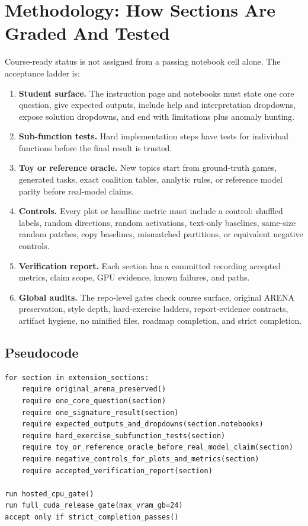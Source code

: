 \documentclass[11pt]{article}
\begin{document}
\section{Methodology: How Sections Are Graded And Tested}
Course-ready status is not assigned from a passing notebook cell alone. The
acceptance ladder is:
\begin{enumerate}
  \item \textbf{Student surface.} The instruction page and notebooks must state
  one core question, give expected outputs, include help and interpretation
  dropdowns, expose solution dropdowns, and end with limitations plus anomaly
  hunting.
  \item \textbf{Sub-function tests.} Hard implementation steps have tests for
  individual functions before the final result is trusted.
  \item \textbf{Toy or reference oracle.} New topics start from ground-truth
  games, generated tasks, exact coalition tables, analytic rules, or reference
  model parity before real-model claims.
  \item \textbf{Controls.} Every plot or headline metric must include a control:
  shuffled labels, random directions, random activations, text-only baselines,
  same-size random patches, copy baselines, mismatched partitions, or
  equivalent negative controls.
  \item \textbf{Verification report.} Each section has a committed
   recording accepted metrics, claim scope,
  GPU evidence, known failures, and paths.
  \item \textbf{Global audits.} The repo-level gates check course surface,
  original ARENA preservation, style depth, hard-exercise ladders,
  report-evidence contracts, artifact hygiene, no minified files, roadmap
  completion, and strict completion.
\end{enumerate}

\subsection*{Pseudocode}
\begin{verbatim}
for section in extension_sections:
    require original_arena_preserved()
    require one_core_question(section)
    require one_signature_result(section)
    require expected_outputs_and_dropdowns(section.notebooks)
    require hard_exercise_subfunction_tests(section)
    require toy_or_reference_oracle_before_real_model_claim(section)
    require negative_controls_for_plots_and_metrics(section)
    require accepted_verification_report(section)

run hosted_cpu_gate()
run full_cuda_release_gate(max_vram_gb=24)
accept only if strict_completion_passes()
\end{verbatim}
\end{document}
